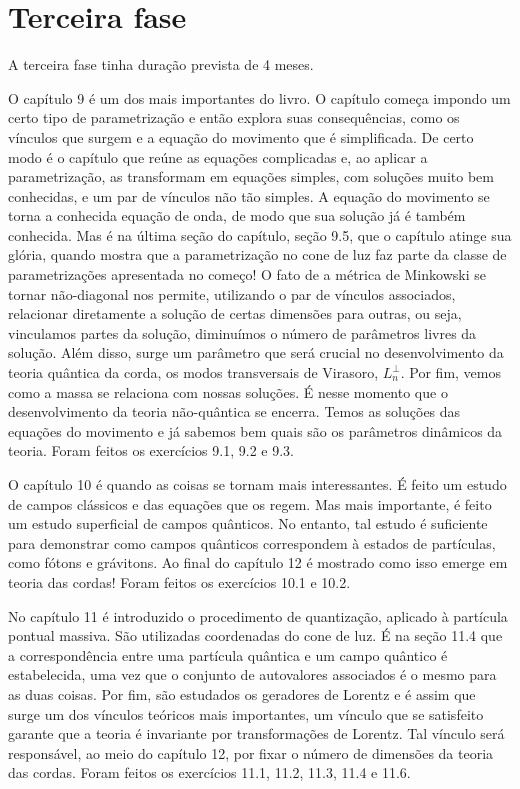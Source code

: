 \documentclass[oneside, 12pt]{article}
\begin{document}
\section{Terceira fase}

A terceira fase tinha duração prevista de 4 meses.\par 

O capítulo 9 é um dos mais importantes do livro. O capítulo começa impondo um certo tipo de parametrização e então explora suas consequências, como os vínculos que surgem e a equação do movimento que é simplificada. De certo modo é o capítulo que reúne as equações complicadas e, ao aplicar a parametrização, as transformam em equações simples, com soluções muito bem conhecidas, e um par de vínculos não tão simples. A equação do movimento se torna a conhecida equação de onda, de modo que sua solução já é também conhecida. Mas é na última seção do capítulo, seção 9.5, que o capítulo atinge sua glória, quando mostra que a parametrização no cone de luz faz parte da classe de parametrizações apresentada no começo! O fato de a métrica de Minkowski se tornar não-diagonal nos permite, utilizando o par de vínculos associados, relacionar diretamente a solução de certas dimensões para outras, ou seja, vinculamos partes da solução, diminuímos o número de parâmetros livres da solução. Além disso, surge um parâmetro que será crucial no desenvolvimento da teoria quântica da corda, os modos transversais de Virasoro, \(L_n^{\perp}\). Por fim, vemos como a massa se relaciona com nossas soluções. É nesse momento que o desenvolvimento da teoria não-quântica se encerra. Temos as soluções das equações do movimento e já sabemos bem quais são os parâmetros dinâmicos da teoria. Foram feitos os exercícios 9.1, 9.2 e 9.3.\par 

O capítulo 10 é quando as coisas se tornam mais interessantes. É feito um estudo de campos clássicos e das equações que os regem. Mas mais importante, é feito um estudo superficial de campos quânticos. No entanto, tal estudo é suficiente para demonstrar como campos quânticos correspondem à estados de partículas, como fótons e grávitons. Ao final do capítulo 12 é mostrado como isso emerge em teoria das cordas! Foram feitos os exercícios 10.1 e 10.2. \par 

No capítulo 11 é introduzido o procedimento de quantização, aplicado à partícula pontual massiva. São utilizadas coordenadas do cone de luz. É na seção 11.4 que a correspondência entre uma partícula quântica e um campo quântico é estabelecida, uma vez que o conjunto de autovalores associados é o mesmo para as duas coisas. Por fim, são estudados os geradores de Lorentz e é assim que surge um dos vínculos teóricos mais importantes, um vínculo que se satisfeito garante que a teoria é invariante por transformações de Lorentz. Tal vínculo será responsável, ao meio do capítulo 12, por fixar o número de dimensões da teoria das cordas. Foram feitos os exercícios 11.1, 11.2, 11.3, 11.4 e 11.6. \par 
\end{document}
